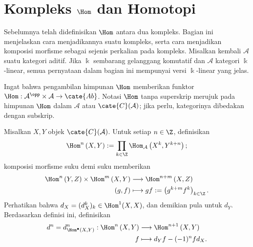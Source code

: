 
\section{Kompleks \texorpdfstring{$\Hom$}{Hom} dan Homotopi}\label{sec:Hom-cplx}
\hypertarget{o014.aljabr2.chapter3.hom-complex-and-homotopy}{ }

Sebelumnya telah didefinisikan $\Hom$ antara dua kompleks. Bagian ini
menjelaskan cara menjadikannya suatu kompleks, serta cara menjadikan komposisi
morfisme sebagai sejenis perkalian pada kompleks. Misalkan kembali
$\mathcal{A}$ suatu kategori aditif. Jika $\Bbbk$ sembarang
gelanggang komutatif dan $\mathcal{A}$ kategori $\Bbbk$-linear, semua
pernyataan dalam bagian ini mempunyai versi $\Bbbk$-linear yang jelas.

Ingat bahwa pengambilan himpunan $\Hom$ memberikan funktor
$\Hom:\mathcal{A}^{\opp}\times\mathcal{A}\to\cate{Ab}$. Notasi $\Hom$ tanpa
superskrip merujuk pada himpunan $\Hom$ dalam $\mathcal{A}$ atau
$\cate{C}(\mathcal{A})$; jika perlu, kategorinya dibedakan dengan subskrip.

\begin{definisi}\label{def:Hom-cplx}
	Misalkan $X,Y$ objek $\cate{C}(\mathcal{A})$. Untuk setiap $n\in\Z$,
	definisikan
	\[ \Hom^n\left(X, Y \right) := \prod_{k \in \Z} \Hom_{\mathcal{A}}\left( X^k, Y^{k+n} \right); \]
	komposisi morfisme suku demi suku memberikan
	\begin{equation}\label{eqn:Hom-cplx-multiplication}\begin{aligned}
		\Hom^n \left(Y, Z \right) \times \Hom^m\left( X, Y \right) & \longrightarrow \Hom^{n+m}\left(X , Z \right) \\
		(g, f) & \longmapsto gf := \left( g^{k+m} f^k \right)_{k \in \Z}.
	\end{aligned}\end{equation}
	Perhatikan bahwa $d_X=(d_X^k)_k\in\Hom^1(X,X)$, dan demikian pula untuk
	$d_Y$. Berdasarkan definisi ini, definisikan
	\begin{align*}
		d^n = d_{\Hom^\bullet(X, Y)}^n: \Hom^n\left(X, Y \right) & \longrightarrow \Hom^{n+1}\left(X, Y \right) \\
		f & \longmapsto d_Y f - (-1)^n f d_X.
	\end{align*}
\end{definisi}

